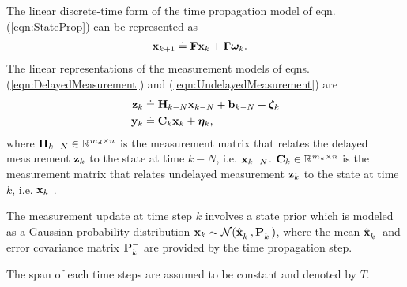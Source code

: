 The linear discrete-time form of the time propagation model of eqn. (\ref{eqn:StateProp}) can be represented as
\begin{align}
	\label{eqn:LinearStateProp}
	\mathbf{x}_{k+1} &\doteq \mathbf{F} \mathbf{x}_k + \boldsymbol{\Gamma} \boldsymbol{\omega}_k.
\end{align}
The linear representations of the measurement models of eqns. (\ref{eqn:DelayedMeasurement}) and (\ref{eqn:UndelayedMeasurement}) are
\begin{align} \label{eqn:LinearDelayedMeasurement}
	\mathbf{z}_k &\doteq \mathbf{H}_{k-N} \mathbf{x}_{k-N} + \mathbf{b}_{k-N} +\boldsymbol{\zeta}_k \\
	\label{eqn:LinearUndelayedMeasurement}
	\mathbf{y}_k &\doteq \mathbf{C}_k \mathbf{x}_k + \boldsymbol{\eta}_k,
\end{align}
where $\mathbf{H}_{k-N} \in \mathbb{R}^{m_d \times n}$ is the measurement matrix that relates the delayed measurement $\mathbf{z}_{k}$ to the state at time $k-N$, i.e. $\mathbf{x}_{k-N}$. 
$\mathbf{C}_k\in \mathbb{R}^{m_u \times n}$ is the measurement matrix that relates undelayed measurement $\mathbf{z}_k$ to the state at time $k$, i.e. $\mathbf{x}_k$ .

The measurement update at time step $k$ involves a state prior which is modeled as a Gaussian probability distribution $\mathbf{x}_k \sim \mathcal{N}(\hat{\mathbf{x}}_k^-,\mathbf{P}_k^-)$, where the mean $\hat{\mathbf{x}}_k^-$ and error covariance matrix $\mathbf{P}_k^-$ are provided by the time propagation step.

The span of each time steps are assumed to be constant and denoted by $T$.